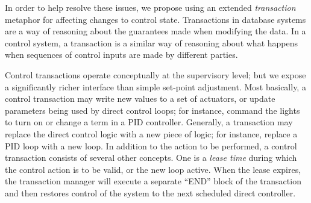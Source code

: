 In order to help resolve these issues, we propose using an extended {\it transaction} metaphor for affecting changes to control state.  Transactions in database systems are a way of reasoning about the guarantees made when modifying the data.  In a control system, a transaction is a similar way of reasoning about what happens when sequences of control inputs are made by different parties.

Control transactions operate conceptually at the supervisory level; but we expose a significantly richer interface than simple set-point adjustment.  Most basically, a control transaction may write new values to a set of actuators, or update parameters being used by direct control loops; for instance, command the lights to turn on or change a term in a PID controller.  Generally, a transaction may replace the direct control logic with a new piece of logic; for instance, replace a PID loop with a new loop.  In addition to the action to be performed, a control transaction consists of several other concepts.  One is a {\it lease time} during which the control action is to be valid, or the new loop active.  When the lease expires, the transaction manager will execute a separate ``END'' block of the transaction and then restores control of the system to the next scheduled direct controller.  

